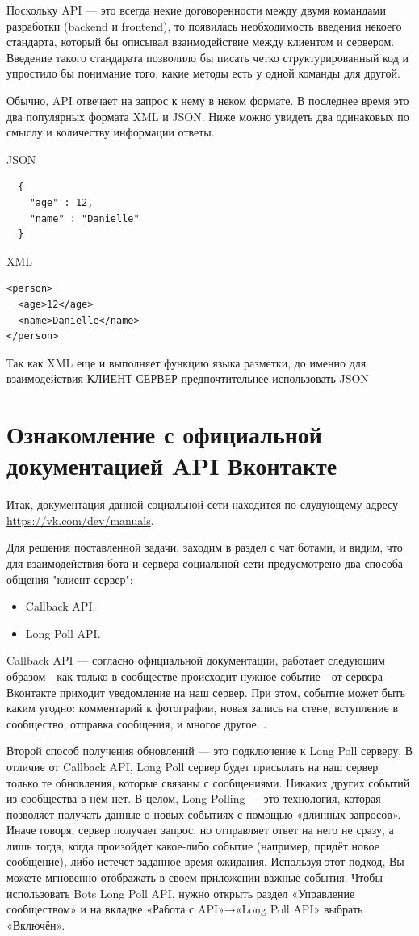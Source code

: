 \documentclass[bachelor, och, coursework, times]{SCWorks}
\begin{document}
Поскольку API --- это всегда некие договоренности между двумя командами разработки (backend и frontend),
то появилась необходимость введения некоего стандарта, который бы описывал взаимодействие
между клиентом и сервером. Введение такого стандарата позволило бы писать четко структурированный
код и упростило бы понимание того, какие методы есть у одной команды для другой.

Обычно, API отвечает на запрос к нему в неком формате. В последнее время это два популярных формата
XML и JSON. Ниже можно увидеть два одинаковых по смыслу и количеству информации ответы.

JSON
\begin{lstlisting}
  {
    "age" : 12,
    "name" : "Danielle"
  }
\end{lstlisting}

XML
\begin{lstlisting}
<person>
  <age>12</age>
  <name>Danielle</name>
</person>
\end{lstlisting}

Так как XML еще и выполняет функцию языка разметки, до именно для взаимодействия КЛИЕНТ-СЕРВЕР предпочтительнее
использовать JSON

\section{Ознакомление с официальной документацией API Вконтакте}
Итак, документация данной социальной сети находится по слудующему адресу
\href{https://vk.com/dev/manuals}{https://vk.com/dev/manuals}.

Для решения поставленной задачи, заходим в раздел с чат ботами, 
и видим, что для взаимодействия бота и сервера социальной сети предусмотрено два способа общения "клиент-сервер":

\begin{itemize}
  \item Callback API.
  \item Long Poll API.
\end{itemize}

Callback API --- согласно официальной документации,
работает следующим образом - как только в сообществе происходит нужное событие - от сервера
Вконтакте приходит уведомление на наш сервер. При этом, событие может быть каким угодно: комментарий к фотографии, новая запись на стене,
вступление в сообщество, отправка сообщения, и многое другое. \cite{VKBots}.

Второй способ получения обновлений --- это подключение к Long Poll серверу.
В отличие от Callback API, Long Poll сервер будет присылать на наш сервер только те обновления,
которые связаны с сообщениями. Никаких других событий из сообщества в нём нет.
В целом, Long Polling --- это технология, которая позволяет получать данные о новых событиях
с помощью «длинных запросов». Иначе говоря, сервер получает запрос, но отправляет ответ
на него не сразу, а лишь тогда, когда произойдет какое-либо событие
(например, придёт новое сообщение), либо истечет заданное время ожидания. 
Используя этот подход, Вы можете мгновенно отображать в своем приложении важные события.
Чтобы использовать Bots Long Poll API, нужно 
открыть раздел «Управление сообществом» и на вкладке
«Работа с API»→«Long Poll API» выбрать «Включён».
\end{document}
